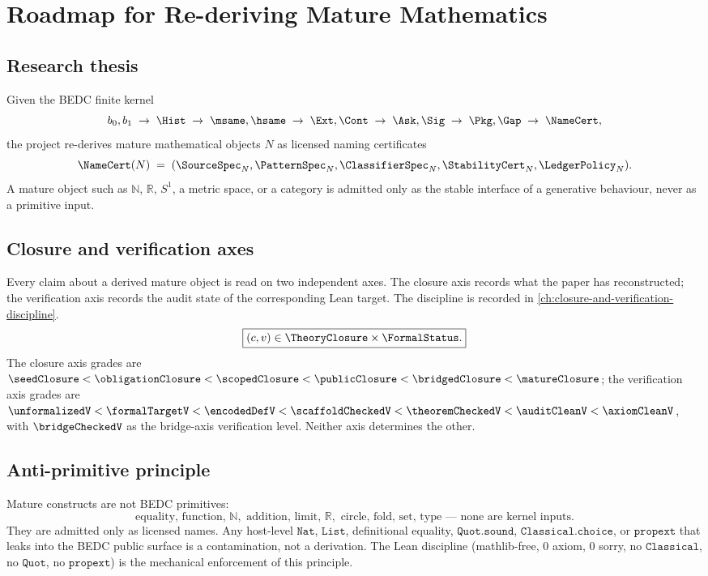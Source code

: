 \chapter{Roadmap for Re-deriving Mature Mathematics}
\label{ch:project-governance-roadmap}

\section{Research thesis}
\label{sec:roadmap-thesis}

Given the BEDC finite kernel
$$
b_0,b_1
\;\to\;
\Hist
\;\to\;
\msame,\hsame
\;\to\;
\Ext,\Cont
\;\to\;
\Ask,\Sig
\;\to\;
\Pkg,\Gap
\;\to\;
\NameCert,
$$
the project re-derives mature mathematical objects $N$ as licensed naming certificates
$$
\NameCert(N)
\;=\;
(\SourceSpec_N, \PatternSpec_N, \ClassifierSpec_N, \StabilityCert_N, \LedgerPolicy_N).
$$
A mature object such as $\mathbb{N}$, $\mathbb{R}$, $S^1$, a metric space, or a category is admitted only as the stable interface of a generative behaviour, never as a primitive input.

\section{Closure and verification axes}
\label{sec:roadmap-closure-and-verification-axes}

Every claim about a derived mature object is read on two independent axes. The closure axis records what the paper has reconstructed; the verification axis records the audit state of the corresponding Lean target. The discipline is recorded in \autoref{ch:closure-and-verification-discipline}.
$$
\boxed{(c, v) \in \TheoryClosure \times \FormalStatus.}
$$
The closure axis grades are $\seedClosure < \obligationClosure < \scopedClosure < \publicClosure < \bridgedClosure < \matureClosure$; the verification axis grades are $\unformalizedV < \formalTargetV < \encodedDefV < \scaffoldCheckedV < \theoremCheckedV < \auditCleanV < \axiomCleanV$, with $\bridgeCheckedV$ as the bridge-axis verification level. Neither axis determines the other.

\section{Anti-primitive principle}
\label{sec:roadmap-anti-primitive}

Mature constructs are not BEDC primitives:
$$
\boxed{\text{equality, function, } \mathbb{N}, \text{ addition, limit, } \mathbb{R}, \text{ circle, fold, set, type --- none are kernel inputs.}}
$$
They are admitted only as licensed names. Any host-level $\texttt{Nat}$, $\texttt{List}$, definitional equality, $\texttt{Quot.sound}$, $\texttt{Classical.choice}$, or $\texttt{propext}$ that leaks into the BEDC public surface is a contamination, not a derivation. The Lean discipline (mathlib-free, $0$ axiom, $0$ sorry, no $\texttt{Classical}$, no $\texttt{Quot}$, no $\texttt{propext}$) is the mechanical enforcement of this principle.

